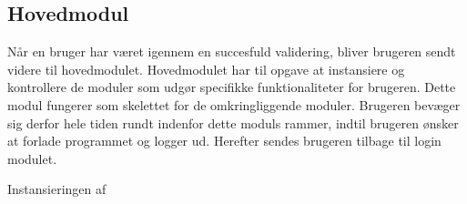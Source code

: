 \subsection{Hovedmodul}
\label{sub:hovedmodul}

Når en bruger har været igennem en succesfuld validering, bliver brugeren sendt videre til hovedmodulet. Hovedmodulet har til opgave at instansiere og kontrollere de moduler som udgør specifikke funktionaliteter for brugeren. Dette modul fungerer som skelettet for de omkringliggende moduler. Brugeren bevæger sig derfor hele tiden rundt indenfor dette moduls rammer, indtil brugeren ønsker at forlade programmet og logger ud. Herefter sendes brugeren tilbage til login modulet.

Instansieringen af 

